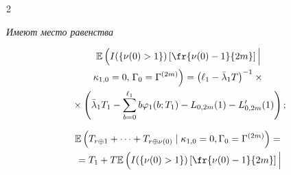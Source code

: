\begin{multicols}{2}
  \vspace*{-4pt}

  

  \noindent

  \textit{Имеют место равенства}

  

\vspace*{-6pt}



\noindent

  \begin{multline*}

        \mathbb{E}  \left(  I(\{\nu(0) >1\})  \left[ \fr{\nu(0)-1}{2m} \right] 

\Big| \right.\\

\kappa_{1,0}=0,

\left. \Gamma_0=\Gamma^{(2m)} 

\vphantom{\left[ \fr{\nu(0)-1}{2m} \right]}

 \right ) =

        \left(\ell_1-\bar\lambda_1 T\right)^{-1} \times{}        \\ 

        {} \times

        \left(

        \bar\lambda_1 T_1 - \sum\limits_{b=0}^{\ell_1} b \varphi_1(b; T_1)

        -L_{0,2m}(1)-L_{0,2m}'(1)    \right);


  \end{multline*}

  

  \vspace*{-12pt}

  

  \noindent

  \begin{multline*}

    \mathbb {E}\left(  T_{r\oplus1} +\cdots+T_{r\oplus \nu(0)}\mid \kappa_{1,0}=0,

    \Gamma_0=\Gamma^{(2m)}\right)={}    \\ 

    {} =

    T_{1}+ T 

    \mathbb {E} \left(

    I(\{\nu(0)>1\}) \left[ \fr{\nu(0)-1}{2m} \right] \Big|\right.\\


\end{multline*}
\end{multicols}
